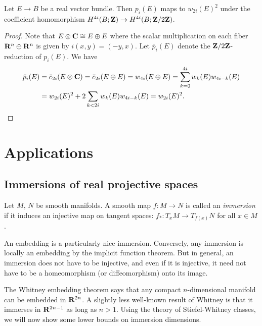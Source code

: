 \documentclass[a4paper,openany]{scrbook}
\begin{document}
\begin{prop}
 Let $E\to B$ be a real vector bundle. Then $p_i(E)$ maps to $w_{2i}(E)^2$ under the coefficient homomorphism $H^{4i}(B;\mathbf Z)\to H^{4i}(B;\mathbf Z/2\mathbf Z)$.
\end{prop}
\begin{proof}
 Note that $E\otimes \mathbf C\cong E\oplus E$ where the scalar multiplication on each fiber $\mathbf R^n\oplus\mathbf R^n$ is given by $i(x,y) = (-y,x)$. Let $\bar p_i(E)$ denote the $\mathbf Z/2\mathbf Z$-reduction of $p_i(E)$. We have
 \begin{align*}\bar p_i(E) &= \bar c_{2i}(E\otimes \mathbf C)= \bar c_{2i}(E\oplus E) = w_{4i}(E\oplus E) = \sum_{k=0}^{4i} w_k(E)w_{4i-k}(E)\\
  & =w_{2i}(E)^2+2\sum_{k<2i}w_k(E)w_{4i-k}(E)=w_{2i}(E)^2.
 \end{align*}
\end{proof}


\section{Applications}

\subsection{Immersions of real projective spaces}

\begin{defn}
Let $M$, $N$ be smooth manifolds. A smooth map $f\colon M \to N$ is called an \emph{immersion} if it induces an injective map on tangent spaces: $f_*\colon T_x M \to T_{f(x)} N$ for all $x \in M$.
\end{defn}

An embedding is a particularly nice immersion. Conversely, any immersion is locally an embedding by the implicit function theorem. But in general, an immersion does not have to be injective, and even if it is injective, it need not have to be a homeomorphism (or diffeomorphism) onto its image.

The Whitney embedding theorem \cite{whitney:embedding} says that any compact $n$-dimensional manifold can be embedded in $\mathbf R^{2n}$. A slightly less well-known result of Whitney \cite{whitney:immersion} is that it immerses in $\mathbf R^{2n-1}$ as long as $n>1$. Using the theory of Stiefel-Whitney classes, we will now show some lower bounds on immersion dimensions.
\end{document}
